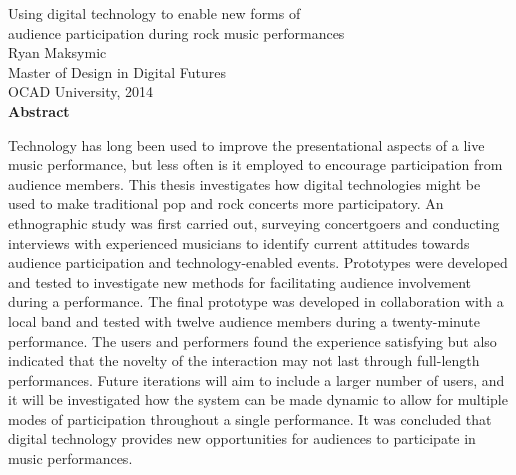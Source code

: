 \begin{center}
{Using digital technology to enable new forms of\\audience participation during rock music performances\\[0.25cm]
Ryan Maksymic\\[0.25cm]
Master of Design in Digital Futures\\[0.25cm]
OCAD University, 2014\\[0.75cm]
\large\textbf{Abstract}}\\
\end{center}

Technology has long been used to improve the presentational aspects of a live music performance, but less often is it employed to encourage participation from audience members. This thesis investigates how digital technologies might be used to make traditional pop and rock concerts more participatory. An ethnographic study was first carried out, surveying concertgoers and conducting interviews with experienced musicians to identify current attitudes towards audience participation and technology-enabled events. Prototypes were developed and tested to investigate new methods for facilitating audience involvement during a performance. The final prototype was developed in collaboration with a local band and tested with twelve audience members during a twenty-minute performance. The users and performers found the experience satisfying but also indicated that the novelty of the interaction may not last through full-length performances. Future iterations will aim to include a larger number of users, and it will be investigated how the system can be made dynamic to allow for multiple modes of participation throughout a single performance. It was concluded that digital technology provides new opportunities for audiences to participate in music performances.

